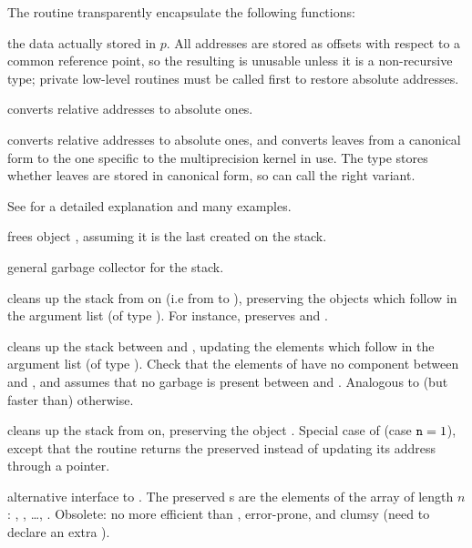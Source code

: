 \noindent The routine  transparently encapsulate the following
functions:

 the  data actually stored in $p$.
All addresses are stored as offsets with respect to a common reference point,
so the resulting  is unusable unless it is a non-recursive type;
private low-level routines must be called first to restore absolute addresses.

 converts relative addresses to
absolute ones.

 converts relative addresses to
absolute ones, and converts leaves from a canonical form to the one
specific to the multiprecision kernel in use. The  type stores
whether leaves are stored in canonical form, so  can call
the right variant.

See  for a detailed explanation and many examples.

 frees object , assuming it is the last created
on the stack.

 general garbage collector
for the stack.

 cleans up the stack from
 on (i.e from  to ), preserving the  objects
which follow in the argument list (of type ). For instance,
 preserves  and .

cleans up the stack between  and , updating
the  elements which follow  in the argument list (of type
). Check that the elements of  have no component between
 and , and assumes that no garbage is present between
 and . Analogous to (but faster than) 
otherwise.

 cleans up the stack  from
 on, preserving the object . Special case of 
(case ${\tt n} = 1$), except that the routine returns the preserved 
instead of updating its address through a pointer.

 alternative interface
to . The preserved s are the elements of the array
 of length $n$: , , \dots,
. Obsolete: no more efficient than ,
error-prone, and clumsy (need to declare an extra ).

